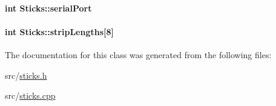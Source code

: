 \hypertarget{classSticks_ae7c50972f44a386b5cd4dcf182f7550a}{
\paragraph[{serial\-Port}]{\setlength{\rightskip}{0pt plus 5cm}int {\bf \-Sticks\-::serial\-Port}}}\label{classSticks_ae7c50972f44a386b5cd4dcf182f7550a}
\hypertarget{classSticks_a4f14013508b750816b5acfe029be7b6a}{
\paragraph[{strip\-Lengths}]{\setlength{\rightskip}{0pt plus 5cm}int {\bf \-Sticks\-::strip\-Lengths}\mbox{[}8\mbox{]}}}\label{classSticks_a4f14013508b750816b5acfe029be7b6a}


\-The documentation for this class was generated from the following files\-:\begin{DoxyCompactItemize}
\item 
src/\hyperlink{sticks_8h}{sticks.\-h}\item 
src/\hyperlink{sticks_8cpp}{sticks.\-cpp}\end{DoxyCompactItemize}
